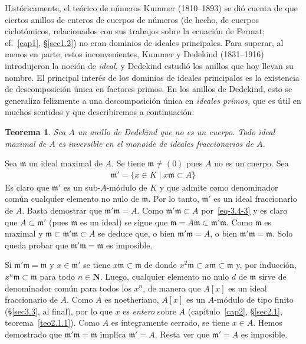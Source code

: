 \documentclass[bibtotoc,leqno,spanish]{amsbook}
\newcommand{\NN}{\mathbf{N}}
\newcommand{\idl}[1]{\mathfrak{#1}}
\numberwithin{equation}{section}
\theoremstyle{note}
\theoremstyle{note}
\newtheorem{theorem}{Teorema}
\theoremstyle{rem}
\numberwithin{theorem}{section}
\numberwithin{proposition}{section}
\numberwithin{definition}{section}
\numberwithin{lemma}{section}
\numberwithin{corollary}{section}
\numberwithin{example}{section}
\numberwithin{footnote}{section}%
\begin{document}
Hist\'oricamente, el te\'orico de n\'umeros Kummer (1810--1893) se di\'o cuenta de que
ciertos anillos de enteros de cuerpos de n\'umeros (de hecho, de cuerpos ciclot\'omicos, relacionados
con sus trabajos sobre la ecuaci\'on de Fermat; cf.~\ref{cap1}, \S\ref{sec1.2}) no eran dominios de ideales principales. Para
superar, al menos en parte, estos inconvenientes, Kummer y Dedekind (1831--1916) introdujeron la noci\'on
de {\em ideal,} y Dedekind estudi\'o los anillos que hoy llevan su nombre. El principal inter\'es de los dominios
de ideales principales es la existencia de descomposici\'on \'unica en factores primos. En los anillos de
Dedekind, esto se generaliza felizmente a una descomposici\'on \'unica en {\em ideales primos,} que es \'util
en muchos sentidos y que describiremos a continuaci\'on:

\begin{theorem}\label{teo3.4.2}
Sea $A$ un anillo de Dedekind que no es un cuerpo. Todo ideal maximal de $A$ es inversible en el monoide de
ideales fraccionarios de $A$.
\end{theorem}

Sea $\idl{m}$ un ideal maximal de $A$. Se tiene $\idl{m}\neq(0)$ pues $A$ no es un cuerpo. Sea
\begin{gather}\label{eq-3.4-3}
\idl{m}' = \{x\in K\mid x\idl{m}\subset A\}
\end{gather}
Es claro que $\idl{m}'$ es un sub-$A$-m\'odulo de $K$ y que admite como denominador com\'un cualquier
elemento no nulo de $\idl{m}$. Por lo tanto, $\idl{m}'$ es un ideal fraccionario de $A$. Basta
demostrar que $\idl{m'}\idl{m} = A$.  Como $\idl{m}'\idl{m}\subset A$ por~\eqref{eq-3.4-3} y es claro que
$A\subset\idl{m}'$ (pues $\idl{m}$ es un ideal) se sigue que $\idl{m}=A\idl{m}\subset\idl{m'}\idl{m}$.
Como $\idl{m}$ es maximal y $\idl{m}\subset\idl{m'}\idl{m}\subset A$ se deduce que, o bien $\idl{m'}\idl{m} = A$,
o bien $\idl{m}'\idl{m} = \idl{m}$. Solo queda probar que $\idl{m}'\idl{m}=\idl{m}$ es imposible.

Si $\idl{m}'\idl{m} = \idl{m}$ y $x\in\idl{m}'$ se tiene $x\idl{m}\subset\idl{m}$ de donde $x^{2}\idl{m}\subset
x\idl{m}\subset\idl{m}$ y, por inducci\'on, $x^{n}\idl{m}\subset\idl{m}$ para todo $n\in\NN$. Luego, cualquier
elemento no nulo $d$ de $\idl{m}$ sirve de denominador com\'un para todos los $x^{n}$, de manera que
$A[x]$ es un ideal fraccionario de $A$. Como $A$ es noetheriano, $A[x]$ es un $A$-m\'odulo de tipo finito
(\S\ref{sec3.3}, al final), por lo que $x$ es {\em entero} sobre $A$ (cap\'itulo~\ref{cap2}, \S\ref{sec2.1}, teorema~\ref{teo2.1.1}).
Como $A$ es \'integramente
cerrado, se tiene $x\in A$. Hemos demostrado que $\idl{m}'\idl{m}=\idl{m}$ implica $\idl{m}'=A$. Resta ver que
$\idl{m}'=A$ es imposible.
\end{document}
